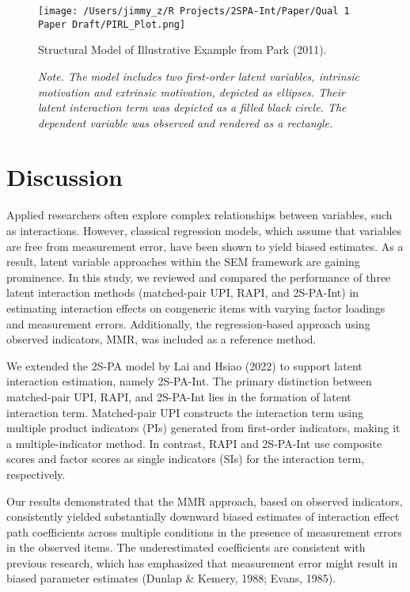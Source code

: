 \documentclass[
  man,mask]{apa6}
\begin{document}
\begin{figure}[h]
\centering
\texttt{[image: /Users/jimmy\_z/R Projects/2SPA-Int/Paper/Qual 1 Paper Draft/PIRL\_Plot.png]}
\caption{Structural Model of Illustrative Example from Park (2011).}
\caption*{\textit{Note. The model includes two first-order latent variables, intrinsic motivation and extrinsic motivation, depicted as ellipses. Their latent interaction term was depicted as a filled black circle. The dependent variable was observed and rendered as a rectangle.}}
\end{figure}

\section{Discussion}\label{discussion}

Applied researchers often explore complex relationships between variables, such as interactions. However, classical regression models, which assume that variables are free from measurement error, have been shown to yield biased estimates. As a result, latent variable approaches within the SEM framework are gaining prominence. In this study, we reviewed and compared the performance of three latent interaction methods (matched-pair UPI, RAPI, and 2S-PA-Int) in estimating interaction effects on congeneric items with varying factor loadings and measurement errors. Additionally, the regression-based approach using observed indicators, MMR, was included as a reference method.

We extended the 2S-PA model by Lai and Hsiao (2022) to support latent interaction estimation, namely 2S-PA-Int. The primary distinction between matched-pair UPI, RAPI, and 2S-PA-Int lies in the formation of latent interaction term. Matched-pair UPI constructs the interaction term using multiple product indicators (PIs) generated from first-order indicators, making it a multiple-indicator method. In contrast, RAPI and 2S-PA-Int use composite scores and factor scores as single indicators (SIs) for the interaction term, respectively.

Our results demonstrated that the MMR approach, based on observed indicators, consistently yielded substantially downward biased estimates of interaction effect path coefficients across multiple conditions in the presence of measurement errors in the observed items. The underestimated coefficients are consistent with previous research, which has emphasized that measurement error might result in biased parameter estimates (Dunlap \& Kemery, 1988; Evans, 1985).
\end{document}
